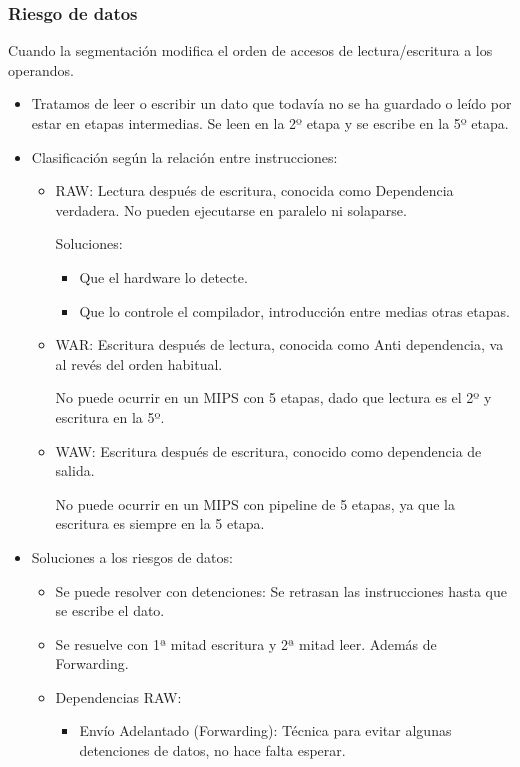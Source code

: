 \documentclass[12pt, twoside, openright]{report} %
\begin{document}
\subsubsection{Riesgo de datos} Cuando la segmentación modifica el orden de accesos de lectura/escritura a los operandos.
\begin{itemize}
	\item Tratamos de leer o escribir un dato que todavía no se ha guardado o leído por estar en etapas intermedias. Se leen en la 2º etapa y se escribe en la 5º etapa.
	\item Clasificación según la relación entre instrucciones:
	      \begin{itemize}
		      \item RAW: Lectura después de escritura, conocida como Dependencia verdadera. No pueden ejecutarse en paralelo ni solaparse.

		            Soluciones:
		            \begin{itemize}
			            \item Que el hardware lo detecte.

			            \item Que lo controle el compilador, introducción entre medias otras etapas.
		            \end{itemize}


		      \item WAR: Escritura después de lectura, conocida como Anti dependencia, va al revés del orden habitual.

		            No puede ocurrir en un MIPS con 5 etapas, dado que lectura es el 2º y escritura en la 5º.
		      \item WAW: Escritura después de escritura, conocido como dependencia de salida.

		            No puede ocurrir en un MIPS con pipeline de 5 etapas, ya que la escritura es siempre en la 5 etapa.
	      \end{itemize}

	\item Soluciones a los riesgos de datos:
	      \begin{itemize}
		      \item Se puede resolver con detenciones: Se retrasan las instrucciones hasta que se escribe el dato.
		      \item Se resuelve con 1ª mitad escritura y 2ª mitad leer. Además de Forwarding.
		      \item Dependencias RAW:
		            \begin{itemize}
			            \item Envío Adelantado (Forwarding): Técnica para evitar algunas detenciones de datos, no hace falta esperar.


\end{itemize}
\end{itemize}
\end{itemize}
\end{document}
